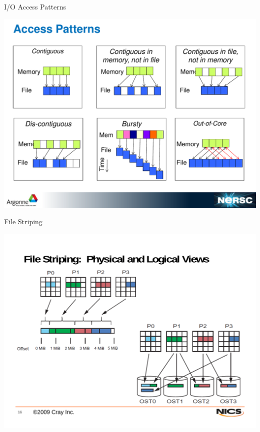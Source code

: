 \documentclass[compress,11pt,xcolor=svgnames,aspectratio=169]{beamer}
\begin{document}
\begin{frame}[fragile]{I/O Access Patterns}

\begin{center}
\includegraphics[scale=0.35]{io-patterns}
\end{center}

\end{frame}

\begin{frame}[fragile]{File Striping}

\vspace*{-0.7cm}

\begin{center}
\includegraphics[scale=0.35]{fig/file-striping}
\end{center}

\nocite{PIOTAPO12}

\end{frame}
\end{document}
